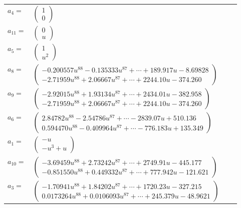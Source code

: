 \documentclass[1p]{elsarticle_modified}
\theoremstyle{definition}
\begin{document}
\begin{tabular}{m{7pt} m{180pt} m{7pt} m{180pt} }
\flushright $a_{4}=$&$\begin{pmatrix}1\\0\end{pmatrix}$ \\
\flushright $a_{11}=$&$\begin{pmatrix}0\\u\end{pmatrix}$ \\
\flushright $a_{5}=$&$\begin{pmatrix}1\\u^2\end{pmatrix}$ \\
\flushright $a_{8}=$&$\begin{pmatrix}-0.200557 u^{88}-0.135333 u^{87}+\cdots+189.917 u-8.69828\\-2.71959 u^{88}+2.06667 u^{87}+\cdots+2244.10 u-374.260\end{pmatrix}$ \\
\flushright $a_{9}=$&$\begin{pmatrix}-2.92015 u^{88}+1.93134 u^{87}+\cdots+2434.01 u-382.958\\-2.71959 u^{88}+2.06667 u^{87}+\cdots+2244.10 u-374.260\end{pmatrix}$ \\
\flushright $a_{6}=$&$\begin{pmatrix}2.84782 u^{88}-2.54786 u^{87}+\cdots-2839.07 u+510.136\\0.594470 u^{88}-0.409964 u^{87}+\cdots-776.183 u+135.349\end{pmatrix}$ \\
\flushright $a_{1}=$&$\begin{pmatrix}- u\\- u^3+u\end{pmatrix}$ \\
\flushright $a_{10}=$&$\begin{pmatrix}-3.69459 u^{88}+2.73242 u^{87}+\cdots+2749.91 u-445.177\\-0.851550 u^{88}+0.449332 u^{87}+\cdots+777.942 u-121.621\end{pmatrix}$ \\
\flushright $a_{3}=$&$\begin{pmatrix}-1.70941 u^{88}+1.84202 u^{87}+\cdots+1720.23 u-327.215\\0.0173264 u^{88}+0.0106093 u^{87}+\cdots+245.379 u-48.9621\end{pmatrix}$ \\

\end{tabular}
\end{document}
